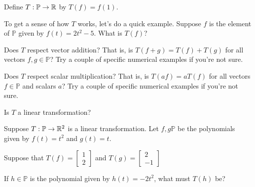 



Define $T: \mathbb{P} \rightarrow \mathbb R$ by $T(f) = f(1)$.  

To get a sense of how $T$ works, let's do a quick example.  Suppose $f$ is the element of 
$\mathbb{P}$ given by $f(t) = 2t^2 -5$.  
What is $T(f)$?  



Does $T$ respect vector addition?  That is, is $T(f+g) = T(f) + T(g)$ for all 
vectors $f,g \in \mathbb{P}$?
Try a couple of specific numerical examples if you're not sure.  


Does $T$ respect scalar multiplication?  
That is, is $T(af) = aT(f)$ for all vectors $f \in \mathbb{P}$ and scalars $a$?
Try a couple of specific numerical examples if you're not sure.  



Is $T$ a linear transformation?


\edXsolution{ 
}

\endedxproblem



\endedxvertical








Suppose $T: \mathbb{P} \rightarrow \mathbb R^2$ is a linear transformation.  Let $f,g\mathbb{P}$ be
the polynomials given by $f(t) = t^2$ and $g(t) = t$.  

Suppose that $T(f) = \left[\begin{array}{c} 1 \\ 2  \end{array} \right]$
and $T(g) = \left[\begin{array}{c} 2 \\ -1  \end{array} \right]$



If $h \in \mathbb{P}$ is the polynomial given by $h(t) = -2t^2$, what must $T(h)$ be?


